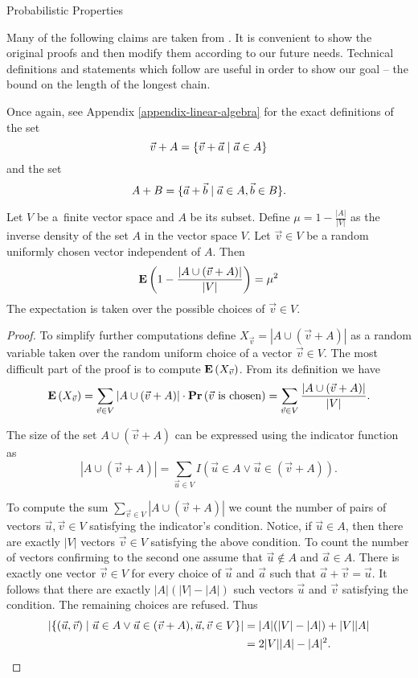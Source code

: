 \begin{section}{Probabilistic Properties}
\label{section-probabilistic-properties}

Many of the following claims are taken from \cite{DBLP:journals/jacm/AlonDMPT99}. It is convenient to show the original proofs and then modify them according to our future needs. Technical definitions and statements which follow are useful in order to show our goal -- the bound on the length of the longest chain.

Once again, see Appendix \ref{appendix-linear-algebra} for the exact definitions of the set \[ \vec{v} + A = \{ \vec{v} + \vec{a} \mid \vec{a} \in A \} \] and the set \[ A + B = \{ \vec{a} + \vec{b} \mid \vec{a} \in A, \vec{b} \in B \} \text{.} \]

\begin{lemma}
\label{lemma-choose-random-vector}
Let $V$ be a~finite vector space and $A$ be its subset. Define $\mu = 1 - \frac{|A|}{|V|}$ as the inverse density of the set $A$ in the vector space $V$. Let $\vec{v} \in V$ be a random uniformly chosen vector independent of $A$. Then
\begin{displaymath}
\mathbf{E}\left(1 - \frac{|A \cup (\vec{v} + A)|}{|V|}\right) = \mu^2
\end{displaymath}
The expectation is taken over the possible choices of $\vec{v} \in V$.

\begin{proof}
To simplify further computations define $X_{\vec{v}} = |A \cup (\vec{v} + A)|$ as a random variable taken over the random uniform choice of a vector $\vec{v} \in V$. The most difficult part of the proof is to compute $\mathbf{E}\left(X_{\vec{v}}\right)$. From its definition we have
\[
\mathbf{E}\left(X_{\vec{v}}\right) = \displaystyle\sum_{\vec{v} \in V} |A \cup (\vec{v} + A)| \cdot \mathbf{Pr}\left(\vec{v} \text{ is chosen}\right) = \displaystyle\sum_{\vec{v} \in V} \frac{|A \cup (\vec{v} + A)|}{|V|} \text{.}
\]

The size of the set $A \cup (\vec{v} + A)$ can be expressed using the indicator function as
\[
|A \cup (\vec{v} + A)| = \displaystyle\sum_{\vec{u} \in V} I(\vec{u} \in A \vee \vec{u} \in (\vec{v} + A)) \text{.}
\]

To compute the sum $\sum_{\vec{v} \in V}|A \cup (\vec{v} + A)|$ we count the number of pairs of vectors $\vec{u}, \vec{v} \in V$ satisfying the indicator's condition. Notice, if $\vec{u} \in A$, then there are exactly $|V|$ vectors $\vec{v} \in V$ satisfying the above condition. To count the number of vectors confirming to the second one assume that $\vec{u} \notin A$ and $\vec{a} \in A$. There is exactly one vector $\vec{v} \in V$ for every choice of $\vec{u}$ and $\vec{a}$ such that $\vec{a} + \vec{v} = \vec{u}$. It follows that there are exactly $|A|(|V| - |A|)$ such vectors $\vec{u}$ and $\vec{v}$ satisfying the condition. The remaining choices are refused. Thus
\[ 
\begin{split}
|\{(\vec{u}, \vec{v}) \mid \vec{u} \in A \vee \vec{u} \in (\vec{v} + A), \vec{u}, \vec{v} \in V \}| 
	& = |A|(|V| - |A|) + |V||A| \\
	& = 2|V||A| - |A|^2 \text{.} \\
\end{split}
\]


\end{proof}
\end{lemma}
\end{section}
